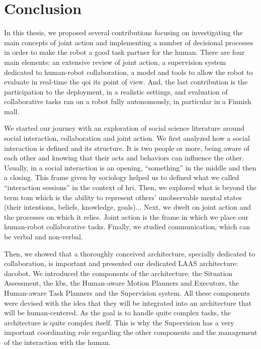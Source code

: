 \documentclass[a4paper,11pt,twoside]{StyleThese}
\begin{document}
\fi


\chapter*{Conclusion}


In this thesis, we proposed several contributions focusing on investigating the main concepts of joint action and implementing a number of decisional processes in order to make the robot a good task partner for the human. There are four main elements: an extensive review of joint action, a supervision system dedicated to human-robot collaboration, a model and tools to allow the robot to evaluate in real-time the \acrlong{qoi} its point of view. And, the last contribution is the participation to the deployment, in a realistic settings, and evaluation of collaborative tasks ran on a robot fully autonomously, in particular in a Finnish mall. 

We started our journey with an exploration of social science literature around social interaction, collaboration and joint action. We first analyzed how a social interaction is defined and its structure. It is two people or more, being aware of each other and knowing that their acts and behaviors can influence the other. Usually, in a social interaction is an opening, ``something'' in the middle and then a closing. This frame given by sociology helped us to defined what we called ``interaction sessions'' in the context of \acrshort{hri}. Then, we explored what is beyond the term \acrfull{tom} which is the ability to represent others' unobservable mental states (\ie their intentions, beliefs, knowledge, goals)... Next, we dwelt on joint action and the processes on which it relies. Joint action is the frame in which we place our human-robot collaborative tasks. Finally, we studied communication, which can be verbal and non-verbal.

Then, we showed that a thoroughly conceived architecture, specially dedicated to collaboration, is important and presented our dedicated LAAS architecture: \acrfull{dacobot}. We introduced the components of the architecture: the Situation Assessment, the \acrlong{kb}s, the Human-aware Motion Planners and Executors, the Human-aware Task Planners and the Supervision system. All these components were devised with the idea that they will be integrated into an architecture that will be human-centered. As the goal is to handle quite complex tasks, the architecture is quite complex itself. This is why the Supervision has a very important coordinating role regarding the other components and the management of the interaction with the human. 
\end{document}
